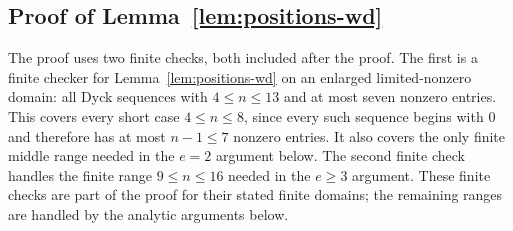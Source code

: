 \documentclass[11pt]{article}
\theoremstyle{plain}
\theoremstyle{definition}
\theoremstyle{remark}
\begin{document}
\subsection{Proof of Lemma~\ref{lem:positions-wd}}
\label{subsec:proof-positions-wd}
The proof uses two finite checks, both included after the proof.  The first is a
finite checker for Lemma~\ref{lem:positions-wd} on an enlarged
limited-nonzero domain: all Dyck sequences with \(4\le n\le 13\) and at most
seven nonzero entries.  This covers every short case \(4\le n\le 8\), since
every such sequence begins with \(0\) and therefore has at most \(n-1\le 7\)
nonzero entries.  It also covers the only finite middle
range needed in the \(e=2\) argument below.  The second finite check handles
the finite range \(9\le n\le 16\) needed in the \(e\ge 3\) argument.  These
finite checks are part of the proof for their stated finite domains; the
remaining ranges are handled by the analytic arguments below.
\end{document}
